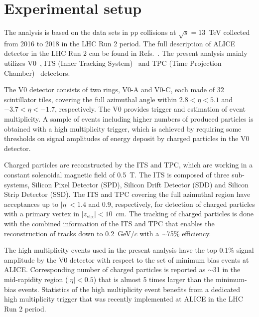 

\section{Experimental setup}
\label{sec:experiment}

The analysis is based on the data sets in pp collisions at $\sqrt{s} = 13$~TeV collected from 2016 to 2018 in the LHC Run 2 period.  The full description of ALICE detector in the LHC Run 2 can be found in Refs.~\cite{Aamodt:2008zz,Abelev:2014ffa}. The present analysis mainly utilizes V0~\cite{Abbas:2013taa}, ITS (Inner Tracking System)~\cite{aliceITS} and TPC (Time Projection Chamber)~\cite{aliceTPC} detectors.


The V0 detector consists of two rings, V0-A and V0-C, each made of 32 scintillator tiles, covering the full azimuthal angle within $2.8 < \eta < 5.1$ and $-3.7 < \eta < -1.7$, respectively. The V0 provides trigger and estimation of event multiplicity. A sample of events including higher numbers of produced particles is obtained with a high multiplicity trigger, which is achieved by requiring some thresholds on signal amplitudes of energy deposit by charged particles in the V0 detector.

Charged particles are reconstructed by the ITS and TPC, which are working in a constant solenoidal magnetic field of 0.5~T.  The ITS is composed of three sub-systems, Silicon Pixel Detector (SPD), Silicon Drift Detector (SDD) and Silicon Strip Detector (SSD). The ITS and TPC covering the full azimuthal region have acceptances up to $|\eta| < 1.4$ and 0.9, respectively, for detection of charged particles with a primary vertex in $|z_\mathrm{vtx}| < 10$~cm. The tracking of charged particles is done with the combined information of the ITS and TPC that enables the reconstruction of tracks down to 0.2~GeV/$c$ with a $\sim $75\% efficiency.


The high multiplicity events used in the present analysis have the top 0.1\% signal amplitude by the V0 detector with respect to the set of minimum bias events at ALICE. Corresponding number of charged particles is reported as $\sim$31 in the mid-rapidity region ($|\eta|<0.5$) that is almost 5 times larger than the minimum-bias events.  Statistics of the high multiplicity event benefits from a dedicated high multiplicity trigger that was recently implemented at ALICE  in the LHC Run 2 period.  
 


